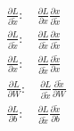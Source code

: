 \documentclass{article}
\newcommand\·{\ensuremath{\cdot}}
\newcommand\…{\ensuremath{\ldots}}
\newcommand\pf[2]{\ensuremath{\frac{\partial {#1}}{\partial {#2}}}}
\newcommand\1{\ensuremath{\mathds{1}}}
\begin{document}
\subsubsection{}
\begin{align}
  \pf{L}{\tilde{x}}:\quad
  \pf{L}{x}\pf{x}{\tilde{x}}\\
  \pf{L}{\tilde{x}}:\quad
  \pf{L}{\tilde{x}}\pf{x}{\tilde{x}}\\
  \pf{L}{x}:\quad
  \pf{L}{\tilde{x}}\pf{\tilde{x}}{x}\\
  \pf{L}{W}:\quad
  \pf{L}{\tilde{x}}\pf{\tilde{x}}{W}\\
  \pf{L}{b}:\quad
  \pf{L}{\tilde{x}}\pf{\tilde{x}}{b}
\end{align}
\end{document}
